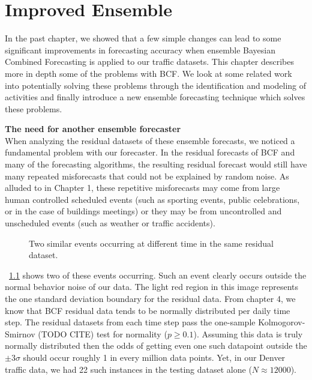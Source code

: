 \chapter{Improved Ensemble}
In the past chapter, we showed that a few simple changes can lead to some significant improvements in forecasting accuracy when ensemble Bayesian Combined Forecasting is applied to our traffic datasets.  This chapter describes more in depth some of the problems with BCF.  We look at some related work into potentially solving these problems through the identification and modeling of activities and finally introduce a new ensemble forecasting technique which solves these problems.  


\bigskip
\noindent \textbf{The need for another ensemble forecaster} \\
When analyzing the residual datasets of these ensemble forecasts, we noticed a fundamental problem with our forecaster.  In the residual forecasts of BCF and many of the forecasting algorithms, the resulting residual forecast would still have many repeated misforecasts that could not be explained by random noise.  As alluded to in Chapter 1, these repetitive misforecasts may come from large human controlled scheduled events (such as sporting events, public celebrations, or in the case of buildings meetings) or they may be from uncontrolled and unscheduled events (such as weather or traffic accidents).  

\begin{figure}[]
	\begin{center}
	\end{center}
	\caption{Two similar events occurring at different time in the same residual dataset.}
	\label{fig:sample_residual_events}
\end{figure}

~\ref{fig:sample_residual_events} shows two of these events occurring.  Such an event clearly occurs outside the normal behavior noise of our data.  The light red region in this image represents the one standard deviation boundary for the residual data.  From chapter 4, we know that BCF residual data tends to be normally distributed per daily time step.  The residual datasets from each time step pass the one-sample Kolmogorov-Smirnov (TODO CITE) test for normality ($p \ge 0.1$).  Assuming this data is truly normally distributed then the odds of getting even one such datapoint outside the $\pm 3 \sigma$ should occur roughly 1 in every million data points.  Yet, in our Denver traffic data, we had 22 such instances in the testing dataset alone ($N \approx 12000$).  

